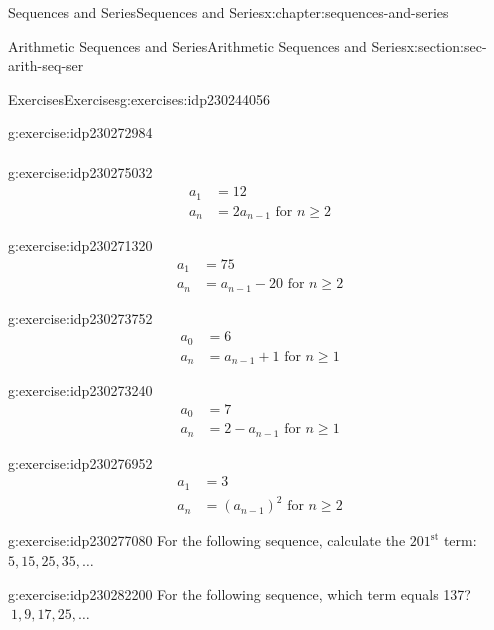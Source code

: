 \documentclass[twoside,10pt,]{book}
\numberwithin{equation}{section}
\newcommand{\upst}[1]{{#1^{\text{st}}}}
\newcommand{\amp}{&}
\begin{document}
\begin{chapterptx}{Sequences and Series}{}{Sequences and Series}{}{}{x:chapter:sequences-and-series}
\begin{sectionptx}{Arithmetic Sequences and Series}{}{Arithmetic Sequences and Series}{}{}{x:section:sec-arith-seq-ser}
\begin{exercises-subsection}{Exercises}{}{Exercises}{}{}{g:exercises:idp230244056}
\begin{exercisegroup}
\begin{divisionexerciseeg}{13}{}{}{g:exercise:idp230272984}
\begin{align*}
\end{align*}
\end{divisionexerciseeg}%
\begin{divisionexerciseeg}{14}{}{}{g:exercise:idp230275032}%
%
\begin{align*}
a_1\amp = 12\\
a_n\amp = 2a_{n-1}\text{   for }n\ge 2
\end{align*}
\end{divisionexerciseeg}%
\begin{divisionexerciseeg}{15}{}{}{g:exercise:idp230271320}%
%
\begin{align*}
a_1\amp = 75\\
a_n\amp = a_{n-1}-20\text{   for }n\ge 2
\end{align*}
\end{divisionexerciseeg}%
\begin{divisionexerciseeg}{16}{}{}{g:exercise:idp230273752}%
%
\begin{align*}
a_0\amp = 6\\
a_n\amp = a_{n-1}+1\text{   for }n\ge 1
\end{align*}
\end{divisionexerciseeg}%
\begin{divisionexerciseeg}{17}{}{}{g:exercise:idp230273240}%
%
\begin{align*}
a_0\amp = 7\\
a_n\amp = 2-a_{n-1}\text{   for }n\ge 1
\end{align*}
\end{divisionexerciseeg}%
\begin{divisionexerciseeg}{18}{}{}{g:exercise:idp230276952}%
%
\begin{align*}
a_1 \amp = 3\\
a_n\amp = \left(a_{n-1}\right)^2\text{   for }n\ge 2
\end{align*}
\end{divisionexerciseeg}%
\end{exercisegroup}
\par\medskip\noindent
\begin{divisionexercise}{19}{}{}{g:exercise:idp230277080}%
For the following sequence, calculate the \(\upst{201}\) term: \(5, 15, 25, 35, \ldots\)\end{divisionexercise}%
\begin{divisionexercise}{20}{}{}{g:exercise:idp230282200}%
For the following sequence, which term equals 137?     \(\ 1, 9, 17, 25, \ldots\)\end{divisionexercise}%

\end{exercises-subsection}
\end{sectionptx}
\end{chapterptx}
\end{document}
